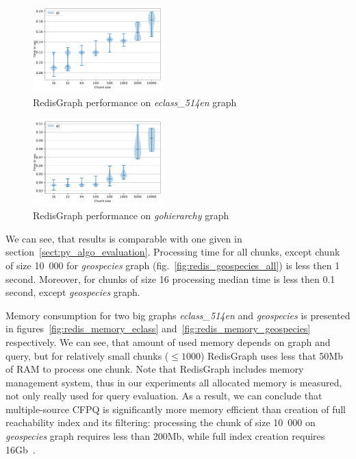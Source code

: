 \begin{figure}[h]
\centering
\includegraphics[width=0.45\textwidth]{data/raw_redis/eclass_514en.pdf}
\caption{RedisGraph performance on \textit{eclass\_514en} graph}
\label{fig:redis_eclass_all}
\end{figure}

\begin{figure}[h]
\centering
\includegraphics[width=0.45\textwidth]{data/raw_redis/gohierarchy.pdf}
\caption{RedisGraph performance on \textit{gohierarchy} graph}
\label{fig:redis_gohierarchy_all}
\end{figure}

We can see, that results is comparable with one given in section~\ref{sect:py_algo_evaluation}. 
Processing time for all chunks, except chunk of size 10~000 for \textit{geospecies} graph (fig.~\ref{fig:redis_geospecies_all}) is less then 1 second.
Moreover, for chunks of size 16 processing median time is less then 0.1 second, except \textit{geospecies} graph.

Memory consumption for two big graphs \textit{eclass\_514en} and \textit{geospecies} is presented in figures~\ref{fig:redis_memory_eclass} and~\ref{fig:redis_memory_geospecies} respectively.
We can see, that amount of used memory depends on graph and query, but for relatively small chunks ($\leq 1000$) RedisGraph uses less that 50Mb of RAM to process one chunk.
Note that RedisGraph includes memory management system, thus in our experiments all allocated memory is measured, not only really used for query evaluation.
As a result, we can conclude that multiple-source CFPQ is significantly more memory efficient than creation of full reachability index and its filtering: processing the chunk of size 10~000 on \textit{geospecies} graph requires less than 200Mb, while full index creation requires 16Gb~\cite{10.1145/3398682.3399163}.  

